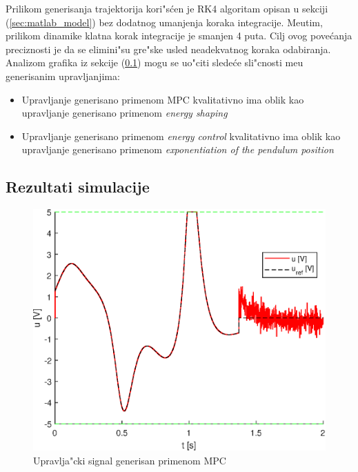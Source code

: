 \documentclass[a4paper,11pt]{article}
\theoremstyle{definition} \newtheorem{deff}{Definicija}[section]
\theoremstyle{definition} \newtheorem{prim}[deff]{Primer}
\theoremstyle{plain} \newtheorem{teor}[deff]{Teorema}
\begin{document}
	Prilikom generisanja trajektorija kori"s\'cen je RK4 algoritam opisan u sekciji (\ref{sec:matlab_model}) bez dodatnog umanjenja koraka integracije. Me\dj utim, prilikom dinamike klatna korak integracije je smanjen 4 puta. Cilj ovog pove\'canja preciznosti je da se elimini"su gre"ske usled neadekvatnog koraka odabiranja. \\
	
	Analizom grafika iz sekcije (\ref{sec:grafici}) mogu se uo"citi slede\'ce sli"cnosti me\dj u generisanim upravljanjima:
	\begin{itemize}
		\item Upravljanje generisano primenom MPC kvalitativno ima oblik kao upravljanje generisano primenom \emph{energy shaping}
		\item Upravljanje generisano primenom \emph{energy control} kvalitativno ima oblik kao upravljanje generisano primenom \emph{exponentiation of the pendulum position}
	\end{itemize} 
	
	
	
	
	
	
	
	
	
	
	
	
	
	
	
	\clearpage
	\subsection{Rezultati simulacije} \label{sec:grafici}
	\begin{figure}[!h]
		\centering
		\includegraphics[width=0.6\linewidth]{slike/Control_MPC_trajectory_norm2.eps}
		\caption{Upravlja"cki signal generisan primenom MPC}
		\label{fig:cntrl_MPC}
	\end{figure}
	
\end{document}
